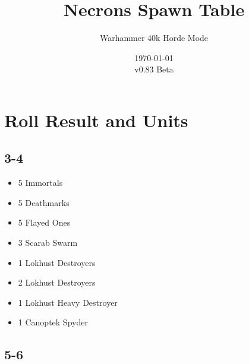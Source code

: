 \documentclass{HordeModeTarot}
\title{Necrons Spawn Table}
\author{Warhammer 40k Horde Mode}
\date{\today \\v0.83 Beta}
\begin{document}
\maketitle

\outputUsingSpawnTableBoilerplate
\section{Roll Result and Units}\hypertarget{roll-results}{}\label{roll-results}

\begin{multicols}{2}

\subsection*{3-4}

\begin{itemize}[leftmargin=*]
\item[] 5 Immortals
\item[] 5 Deathmarks
\item[] 5 Flayed Ones
\item[] 3 Scarab Swarm
\item[] 1 Lokhust Destroyers
\item[] 2 Lokhust Destroyers
\item[] 1 Lokhust Heavy Destroyer
\item[] 1 Canoptek Spyder
\end{itemize}

\subsection*{5-6}


\end{multicols}
\end{document}
